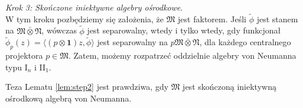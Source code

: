 {\it Krok 3: Skończone iniektywne algebry ośrodkowe}.\\
W tym kroku pozbędziemy się założenia, że $\mathfrak{M}$ jest faktorem.
Jeśli $\tilde{\phi}$ jest stanem na $\mathfrak{M} \bar{\otimes} \mathfrak{N}$,
wówczas $\tilde{\phi}$ jest separowalny,
wtedy i tylko wtedy, gdy funkcjonał
$\tilde{\phi}_{p} (z) = \langle (p \otimes \mathbf{1}) z, \tilde{\phi}\rangle$
jest separowalny na $p\mathfrak{M} \bar{\otimes} \mathfrak{N}$,
dla każdego centralnego projektora $p \in \mathfrak{M}$.
Zatem, możemy rozpatrzeć oddzielnie algebry von Neumanna
typu I$\phantom{}_{n}$ i II$\phantom{}_{1}$.
\begin{Lemma}
\label{lem:step3}
Teza Lematu \ref{lem:step2} jest prawdziwa, gdy $\mathfrak{M}$
jest skończoną iniektywną ośrodkową algebrą von Neumanna.
\end{Lemma}
